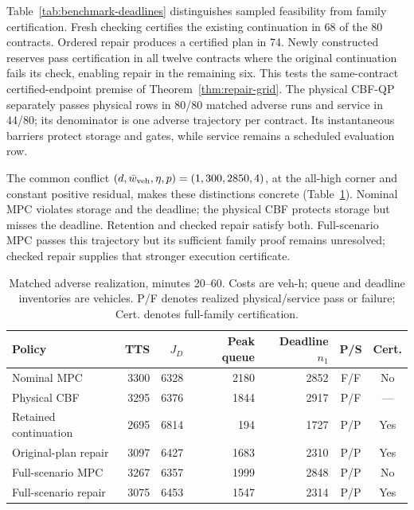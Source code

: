 \documentclass[journal,10pt]{IEEEtran}
\begin{document}
Table~\ref{tab:benchmark-deadlines} distinguishes sampled feasibility from
family certification. Fresh checking certifies the existing continuation in 68 of the 80
contracts. Ordered repair produces a certified plan in 74. Newly constructed
reserves pass certification in all twelve contracts where the original
continuation fails its check, enabling repair in the remaining six. This tests
the same-contract certified-endpoint premise of
Theorem~\ref{thm:repair-grid}. The physical CBF-QP separately passes physical
rows in 80/80 matched adverse runs and service in 44/80; its denominator is
one adverse trajectory per contract. Its instantaneous barriers protect
storage and gates, while service remains a scheduled evaluation row.

The common conflict $(d,\bar w_{\rm veh},\eta,p)=(1,300,2850,4)$, at the all-high
corner and constant positive residual, makes these distinctions concrete
(Table~\ref{tab:benchmark-conflict}). Nominal MPC violates storage and the
deadline; the physical CBF protects storage but misses the deadline.
Retention and checked repair satisfy both. Full-scenario MPC passes this
trajectory but its sufficient family proof remains unresolved; checked
repair supplies that stronger execution certificate.

\begin{table}[t]
\centering\footnotesize
\caption{Matched adverse realization, minutes 20--60. Costs are veh-h;
queue and deadline inventories are vehicles. P/F denotes realized
physical/service pass or failure; Cert. denotes full-family certification.}
\label{tab:benchmark-conflict}
\setlength{\tabcolsep}{3pt}
\begin{tabular}{@{}lrrrrcc@{}}
\toprule
Policy & TTS & $J_D$ & Peak queue & Deadline $n_1$ & P/S & Cert.\\
\midrule
Nominal MPC & 3300 & 6328 & 2180 & 2852 & F/F & No\\
Physical CBF & 3295 & 6376 & 1844 & 2917 & P/F & ---\\
Retained continuation & 2695 & 6814 & 194 & 1727 & P/P & Yes\\
Original-plan repair & 3097 & 6427 & 1683 & 2310 & P/P & Yes\\
Full-scenario MPC & 3267 & 6357 & 1999 & 2848 & P/P & No\\
Full-scenario repair & 3075 & 6453 & 1547 & 2314 & P/P & Yes\\
\bottomrule
\end{tabular}
\end{table}
\end{document}

